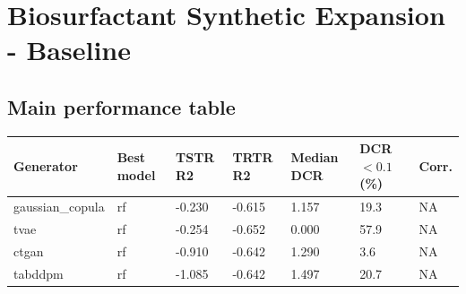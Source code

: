 ﻿\section*{Biosurfactant Synthetic Expansion - Baseline}

\subsection*{Main performance table}
\begin{tabular}{lllllll}
\hline
Generator & Best model & TSTR R2 & TRTR R2 & Median DCR & DCR$<0.1$ (\%) & Corr. \\
\hline
gaussian\_copula & rf & -0.230 & -0.615 & 1.157 & 19.3 & NA \\
tvae & rf & -0.254 & -0.652 & 0.000 & 57.9 & NA \\
ctgan & rf & -0.910 & -0.642 & 1.290 & 3.6 & NA \\
tabddpm & rf & -1.085 & -0.642 & 1.497 & 20.7 & NA \\
\hline
\end{tabular}


